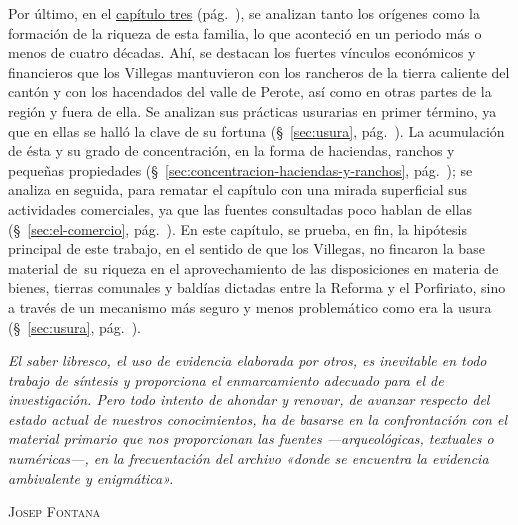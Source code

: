 \documentclass[14pt,twoside,final]{extbook} %
\begin{document}
Por último, en el \hyperref[ch:capitulo-tres]{capítulo tres} (pág.~\pageref{ch:capitulo-tres}), se analizan tanto los orígenes como la formación de la riqueza de esta familia, lo que aconteció en un periodo más o menos de cuatro décadas. Ahí, se destacan los fuertes vínculos económicos y financieros que los Villegas mantuvieron con los rancheros de la tierra caliente del cantón y con los hacendados del valle de Perote, así como en otras partes de la región y fuera de ella. Se analizan sus prácticas usurarias en primer término, ya que en ellas se halló la clave de su fortuna (\S~\ref{sec:usura}, pág.~\pageref{sec:usura}). La acumulación de ésta y su grado de concentración, en la forma de haciendas, ranchos y pequeñas propiedades (\S~\ref{sec:concentracion-haciendas-y-ranchos}, pág.~\pageref{sec:concentracion-haciendas-y-ranchos}); se analiza en seguida, para rematar el capítulo con una mirada superficial sus actividades comerciales, ya que las fuentes consultadas poco hablan de ellas (\S~\ref{sec:el-comercio}, pág.~\pageref{sec:el-comercio}). En este capítulo, se prueba, en fin, la hipótesis principal de este trabajo, en el sentido de que los Villegas, no fincaron la base material de~su riqueza en el aprovechamiento de las disposiciones en materia de bienes, tierras comunales y baldías dictadas entre la Reforma y el Porfiriato, sino a través de un mecanismo más seguro y menos problemático como era la usura (\S~\ref{sec:usura}, pág.~\pageref{sec:usura}).
\newpage
\pagestyle{empty}
\null\vfill
\newpage
\pagestyle{empty}
\begin{flushright}
\begin{minipage}{8cm}
\emph{El saber libresco, el uso de evidencia elaborada por otros, es inevitable en todo trabajo de síntesis y proporciona el enmarcamiento adecuado para el de investigación. Pero todo intento de ahondar y renovar, de avanzar respecto del estado actual de nuestros conocimientos, ha de basarse en la confrontación con el material primario que nos proporcionan las fuentes ---arqueológicas, textuales o numéricas---, en la frecuentación del archivo «donde se encuentra la evidencia ambivalente y enigmática».}
\end{minipage}
\end{flushright}
\begin{flushright}
\textsc{Josep Fontana}
\end{flushright}
\end{document}
